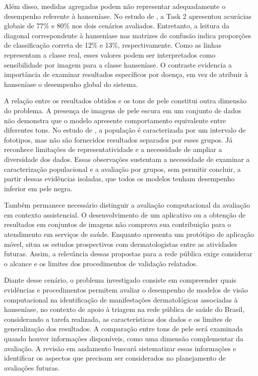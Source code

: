 Além disso, medidas agregadas podem não representar adequadamente o
desempenho referente à hanseníase. No estudo de , a
Task 2 apresentou acurácias globais de 77\% e 80\% nos dois cenários
avaliados. Entretanto, a leitura da diagonal correspondente à hanseníase
nas matrizes de confusão indica proporções de classificação correta de
12\% e 13\%, respectivamente. Como as linhas representam a classe real,
esses valores podem ser interpretados como sensibilidade por imagem para
a classe hanseníase. O contraste evidencia a importância de examinar
resultados específicos por doença, em vez de atribuir à hanseníase o
desempenho global do sistema.

A relação entre os resultados obtidos e os tons de pele constitui outra
dimensão do problema. A presença de imagens de pele escura em um
conjunto de dados não demonstra que o modelo apresente comportamento
equivalente entre diferentes tons. No estudo de , a
população é caracterizada por um intervalo de fototipos, mas não são
fornecidos resultados separados por esses grupos. Já 
reconhece limitações de representatividade e a necessidade de ampliar a
diversidade dos dados. Essas observações sustentam a necessidade de
examinar a caracterização populacional e a avaliação por grupos, sem
permitir concluir, a partir dessas evidências isoladas, que todos os
modelos tenham desempenho inferior em pele negra.

Também permanece necessário distinguir a avaliação computacional da
avaliação em contexto assistencial. O desenvolvimento de um aplicativo
ou a obtenção de resultados em conjuntos de imagens não comprova sua
contribuição para o atendimento em serviços de saúde. Enquanto
 apresenta um protótipo de
aplicação móvel,  situa os estudos prospectivos com
dermatologistas entre as atividades futuras. Assim, a relevância dessas
propostas para a rede pública exige considerar o alcance e os limites
dos procedimentos de validação relatados.

Diante desse cenário, o problema investigado consiste em compreender
quais evidências e procedimentos permitem avaliar o desempenho de
modelos de visão computacional na identificação de manifestações
dermatológicas associadas à hanseníase, no contexto de apoio à triagem
na rede pública de saúde do Brasil, considerando a tarefa realizada, as
características dos dados e os limites de generalização dos resultados.
A comparação entre tons de pele será examinada quando houver informações
disponíveis, como uma dimensão complementar da avaliação. A revisão em
andamento buscará sistematizar essas informações e identificar os
aspectos que precisam ser considerados no planejamento de avaliações
futuras.

